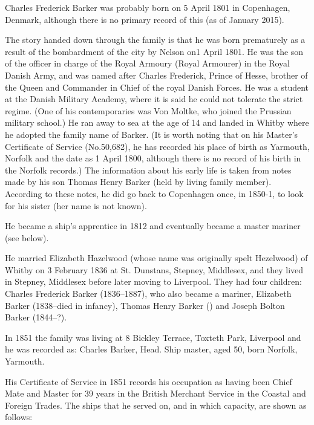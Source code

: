 
Charles Frederick Barker was probably born on	5 April 1801 in	Copenhagen, Denmark, although there is no primary record of this (as of January 2015).

The story handed down through the family is that he was born prematurely as a result of the bombardment of the city by Nelson on1 April 1801. He was the son of the officer in charge of the Royal Armoury (Royal Armourer) in the Royal Danish Army, and was named after Charles Frederick, Prince of Hesse, brother of the Queen and Commander in Chief of the royal Danish Forces. He was a student at the Danish Military Academy, where it is said he could not tolerate the strict regime. (One of his contemporaries was Von Moltke, who joined the Prussian military school.) He ran away to sea at the age of 14 and landed in Whitby where he adopted the family name of Barker. (It is worth noting that on his Master's Certificate of Service (No.50,682), he has recorded his place of birth as Yarmouth, Norfolk and the date as 1 April 1800, although there is no record of his birth in the Norfolk records.) The information about his early life is taken from notes made by his son Thomas Henry Barker (held by living family member). According to these notes, he did go back to Copenhagen once, in 1850-1, to look for his sister (her name is not known).

He became a ship's apprentice in 1812 \cite{CFBShipList} and eventually became a master mariner (see below).

He married Elizabeth Hazelwood (whose name was originally spelt Hezelwood) of Whitby on 3 February 1836 at 
St. Dunstans, Stepney, Middlesex, and they lived in Stepney, Middlesex before later moving to Liverpool. They had four children: Charles Frederick Barker (1836--1887), who also became a mariner, Elizabeth Barker (1838--died in infancy), Thomas Henry Barker () and Joseph Bolton Barker (1844--?). 

In 1851 the family was living at 8 Bickley Terrace, Toxteth Park, Liverpool and he was recorded as:
Charles Barker, Head. Ship master, aged 50, born Norfolk, Yarmouth. \cite{CFB1851}

His Certificate of Service in 1851 records his occupation as having been Chief Mate and Master for 39 years in the British Merchant Service in the Coastal and Foreign Trades. The ships that he served on, and in which capacity,  are shown as follows:

